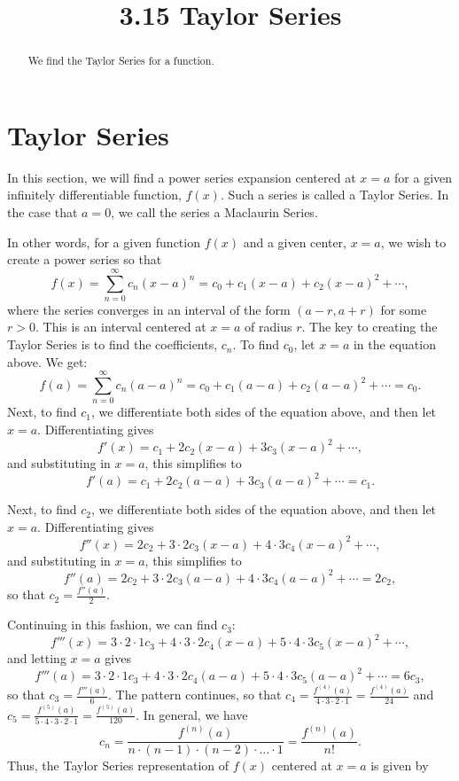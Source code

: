 \documentclass[handout]{ximera}
\title{3.15 Taylor Series}
\begin{document}
\begin{abstract}
We find the Taylor Series for a function.
\end{abstract}

\maketitle

  
\section{Taylor Series}

In this section, we will find a power series expansion centered at $x = a$ for a given infinitely differentiable function, $f(x)$.
Such a series is called a Taylor Series.  In the case that $a = 0$, we call the series a Maclaurin Series.

In other words, for a given function $f(x)$ and a given center, $x = a$, we wish to create a power series so that
\[
f(x) = \sum_{n=0}^\infty c_n (x-a)^n = c_0 + c_1(x-a) + c_2(x-a)^2 + \cdots,
\]
where the series converges in an interval of the form $(a-r, a+r)$ for some $r >0$. This is an interval centered at $x = a$ of radius $r$.
The key to creating the Taylor Series is to find the coefficients, $c_n$.
To find $c_0$, let $x = a$ in the equation above. We get:
\[
f(a) = \sum_{n=0}^\infty c_n (a-a)^n = c_0 + c_1(a-a) + c_2(a-a)^2 + \cdots = c_0.
\]
Next, to find $c_1$, we differentiate both sides of the equation above, and then let $x = a$.
Differentiating gives
\[
f'(x) = c_1 + 2c_2(x-a) + 3c_3(x-a)^2 + \cdots,
\]
and substituting in $x = a$, this simplifies to 
\[
f'(a) = c_1 + 2c_2(a-a) + 3c_3(a-a)^2 + \cdots = c_1.
\]

Next, to find $c_2$, we differentiate both sides of the equation above, and then let $x = a$.
Differentiating gives
\[
f''(x) = 2c_2 + 3\cdot 2 c_3(x-a) + 4\cdot 3 c_4(x-a)^2 + \cdots,
\]
and substituting in $x = a$, this simplifies to 
\[
f''(a) = 2c_2 + 3\cdot 2 c_3(a-a) + 4\cdot 3 c_4(a-a)^2 + \cdots = 2c_2,
\]
so that $c_2 = \frac{f''(a)}{2}$.

Continuing in this fashion, we can find $c_3$:
\[
f'''(x) = 3 \cdot 2 \cdot 1 c_3 + 4\cdot 3 \cdot 2 c_4 (x-a) + 5 \cdot 4 \cdot 3 c_5 (x-a)^2 + \cdots,
\]
and letting $x = a$ gives
\[
f'''(a) = 3 \cdot 2 \cdot 1 c_3 + 4\cdot 3 \cdot 2 c_4 (a-a) + 5 \cdot 4 \cdot 3 c_5 (a-a)^2 + \cdots = 6c_3,
\]
so that $c_3 = \frac{f'''(a)}{6}$.
The pattern continues, so that $c_4 = \frac{f^{(4)}(a)}{4\cdot 3 \cdot 2 \cdot 1} = \frac{f^{(4)}(a)}{24}$
and $c_5 = \frac{f^{(5)}(a)}{5\cdot 4 \cdot 3 \cdot 2 \cdot 1} = \frac{f^{(5)}(a)}{120}$.
In general, we have 
\[
c_n = \frac{f^{(n)}(a)}{n\cdot (n-1) \cdot (n-2) \cdot \dots \cdot 1} = \frac{f^{(n)}(a)}{n!}.
\]
Thus, the Taylor Series representation of $f(x)$ centered at $x = a$ is given by
\end{document}
